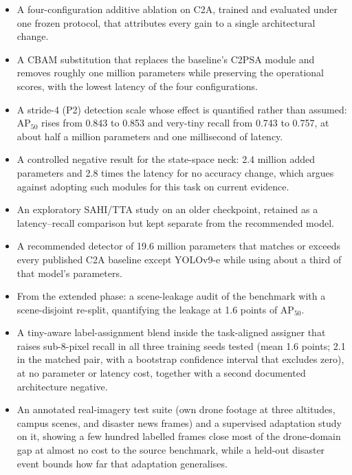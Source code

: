 \documentclass[12pt,a4paper,oneside]{report}
\begin{document}
\begin{itemize}
  \item A four-configuration additive ablation on C2A, trained and evaluated
        under one frozen protocol, that attributes every gain to a single
        architectural change.
  \item A CBAM substitution that replaces the baseline's C2PSA module and
        removes roughly one million parameters while preserving the
        operational scores, with the lowest latency of the four configurations.
  \item A stride-4 (P2) detection scale whose effect is quantified rather
        than assumed: $\mathrm{AP}_{50}$ rises from 0.843 to 0.853 and
        very-tiny recall from 0.743 to 0.757, at about half a million
        parameters and one millisecond of latency.
  \item A controlled negative result for the state-space neck: 2.4 million
        added parameters and 2.8 times the latency for no accuracy change,
        which argues against adopting such modules for this task on current
        evidence.
  \item An exploratory SAHI/TTA study on an older checkpoint, retained as a
        latency--recall comparison but kept separate from the recommended model.
  \item A recommended detector of 19.6 million parameters that matches or
        exceeds every published C2A baseline except YOLOv9-e while using
        about a third of that model's parameters.
  \item From the extended phase: a scene-leakage audit of the benchmark with
        a scene-disjoint re-split, quantifying the leakage at 1.6 points of
        $\mathrm{AP}_{50}$.
  \item A tiny-aware label-assignment blend inside the task-aligned assigner
        that raises sub-8-pixel recall in all three training seeds tested
        (mean 1.6 points; 2.1 in the matched pair, with a bootstrap
        confidence interval that excludes zero), at no parameter or latency
        cost, together with a second documented architecture negative.
  \item An annotated real-imagery test suite (own drone footage at three
        altitudes, campus scenes, and disaster news frames) and a supervised
        adaptation study on it, showing a few hundred labelled frames close
        most of the drone-domain gap at almost no cost to the source
        benchmark, while a held-out disaster event bounds how far that
        adaptation generalises.
\end{itemize}
\end{document}
